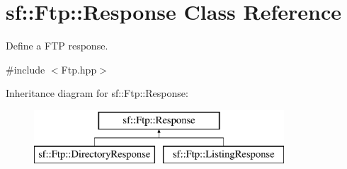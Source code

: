 \hypertarget{classsf_1_1_ftp_1_1_response}{}\section{sf\+:\+:Ftp\+:\+:Response Class Reference}
\label{classsf_1_1_ftp_1_1_response}


Define a F\+TP response.  




{\ttfamily \#include $<$Ftp.\+hpp$>$}

Inheritance diagram for sf\+:\+:Ftp\+:\+:Response\+:\begin{figure}[H]
\begin{center}
\leavevmode
\includegraphics[height=2.000000cm]{classsf_1_1_ftp_1_1_response}
\end{center}
\end{figure}

